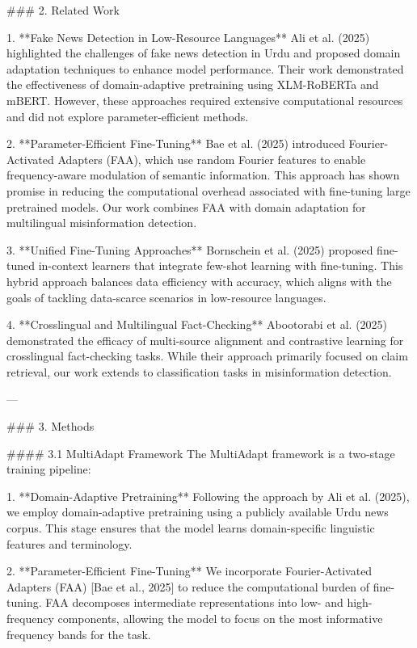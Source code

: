 ### 2. Related Work  

1. **Fake News Detection in Low-Resource Languages**  
   Ali et al. (2025) highlighted the challenges of fake news detection in Urdu and proposed domain adaptation techniques to enhance model performance. Their work demonstrated the effectiveness of domain-adaptive pretraining using XLM-RoBERTa and mBERT. However, these approaches required extensive computational resources and did not explore parameter-efficient methods.  

2. **Parameter-Efficient Fine-Tuning**  
   Bae et al. (2025) introduced Fourier-Activated Adapters (FAA), which use random Fourier features to enable frequency-aware modulation of semantic information. This approach has shown promise in reducing the computational overhead associated with fine-tuning large pretrained models. Our work combines FAA with domain adaptation for multilingual misinformation detection.  

3. **Unified Fine-Tuning Approaches**  
   Bornschein et al. (2025) proposed fine-tuned in-context learners that integrate few-shot learning with fine-tuning. This hybrid approach balances data efficiency with accuracy, which aligns with the goals of tackling data-scarce scenarios in low-resource languages.  

4. **Crosslingual and Multilingual Fact-Checking**  
   Abootorabi et al. (2025) demonstrated the efficacy of multi-source alignment and contrastive learning for crosslingual fact-checking tasks. While their approach primarily focused on claim retrieval, our work extends to classification tasks in misinformation detection.  

---

### 3. Methods  

#### 3.1 MultiAdapt Framework  
The MultiAdapt framework is a two-stage training pipeline:  

1. **Domain-Adaptive Pretraining**  
   Following the approach by Ali et al. (2025), we employ domain-adaptive pretraining using a publicly available Urdu news corpus. This stage ensures that the model learns domain-specific linguistic features and terminology.  

2. **Parameter-Efficient Fine-Tuning**  
   We incorporate Fourier-Activated Adapters (FAA) [Bae et al., 2025] to reduce the computational burden of fine-tuning. FAA decomposes intermediate representations into low- and high-frequency components, allowing the model to focus on the most informative frequency bands for the task.  

